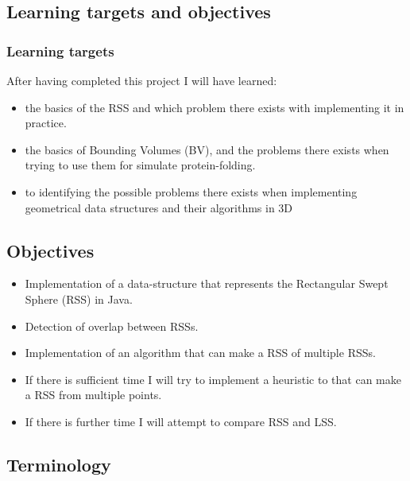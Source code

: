 \subsection{Learning targets and objectives}
\label{learning}
\subsubsection{Learning targets}
After having completed this project I will have learned:
\begin{itemize}
\item the basics of the RSS and which problem there exists with implementing it in practice.
\item the basics of  Bounding Volumes (BV), and the problems there exists when trying to use them for simulate protein-folding.
\item to identifying the possible problems there exists when implementing geometrical data structures and their algorithms in 3D
\end{itemize}

\subsection{Objectives}
\begin{itemize}
\item Implementation of a data-structure that represents the Rectangular Swept Sphere (RSS) in Java.  
\item Detection of overlap between RSSs.
\item Implementation of an algorithm that can make a RSS of multiple RSSs.
\item If there is sufficient time I will try to implement a heuristic to that can make a RSS from multiple points.
\item If there is further time I will attempt to compare RSS and LSS.
\end{itemize}

\subsection{Terminology}

